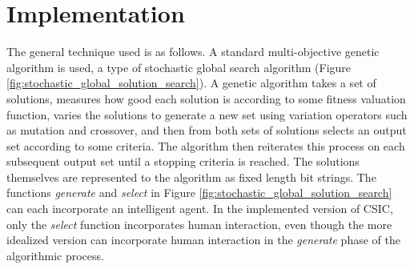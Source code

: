 \section{Implementation}
The general technique used is as follows.  A standard  multi-objective genetic algorithm is used, a type of stochastic global search algorithm (Figure \ref{fig:stochastic_global_solution_search}).  A genetic algorithm takes a set of solutions, measures how good each solution is according to some fitness valuation function, varies the solutions to generate a new set using variation operators such as mutation and crossover, and then from both sets of solutions selects an output set according to some criteria.  The algorithm then reiterates this process on each subsequent output set until a stopping criteria is reached.  The solutions themselves are represented to the algorithm as fixed length bit strings.  
The functions \emph{generate} and \emph{select} in Figure \ref{fig:stochastic_global_solution_search} can each incorporate an intelligent agent.  In the implemented version of CSIC, only the \emph{select} function incorporates human interaction, even though the more idealized version can incorporate human interaction in the \emph{generate} phase of the algorithmic process.  

